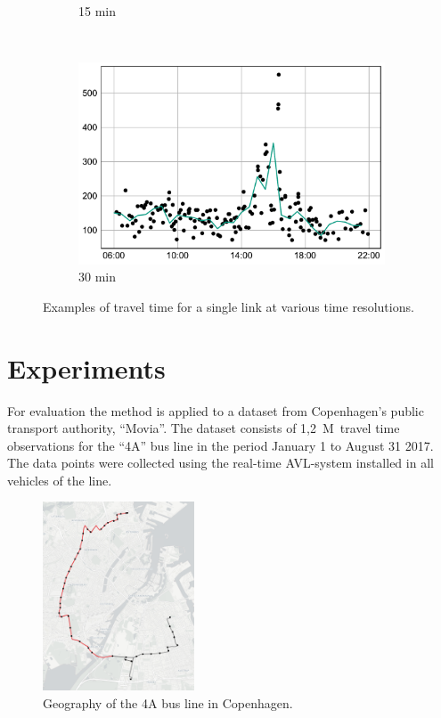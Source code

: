 \documentclass[preprint,11pt,5p,twocolumn]{elsarticle}
\begin{document}
\begin{figure}[!t]
\begin{subfigure}[t]{0.31\textwidth}
        \caption{15 min}
    \end{subfigure}
    ~
    \begin{subfigure}[t]{0.31\textwidth}
        \centering
        \includegraphics[width=\textwidth]{plots/decycle_30min_n.pdf}
        \caption{30 min}
    \end{subfigure}

    \caption{Examples of travel time for a single link at various time resolutions.}
    \label{fig:resolutions}
\end{figure}
\newpage

\section{Experiments}
\label{sec:experiments}

For evaluation the method is applied to a dataset from Copenhagen's public transport authority, ``Movia''. The dataset consists of 1,2~M~travel time observations for the ``4A'' bus line in the period January 1 to August 31 2017. The data points were collected using the real-time AVL-system installed in all vehicles of the line. 

\begin{figure}[!ht]
  \centering
  \includegraphics[width=0.4\textwidth]{drawings/map.png}
  \caption{Geography of the 4A bus line in Copenhagen.}
  \label{fig:4a_map}
\end{figure}
\end{document}

